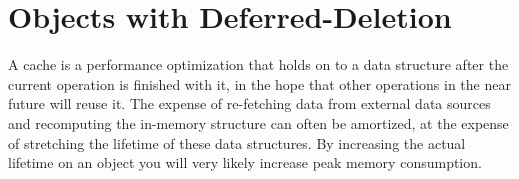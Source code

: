 
\section{Objects with Deferred-Deletion}
\label{deferred-deletion}

A cache is a performance optimization that holds on to a data structure after the
current operation is finished with it, in the hope that other operations in the
near future will reuse it. The expense of re-fetching data from external data
sources and recomputing the in-memory structure can often be amortized, at the
expense of stretching the lifetime of these data structures. By increasing the
actual lifetime on an object you will very likely increase peak memory
consumption.








